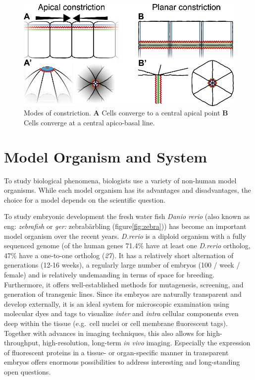 \documentclass[11pt,singlespacinge,twoside]{reedthesis} %
\theoremstyle{definition}
\theoremstyle{definition}
\theoremstyle{definition}
\theoremstyle{remark}
\begin{document}
\begin{figure}

{\centering \includegraphics[width=0.6\linewidth]{figures/intro/constriction} 

}

\caption[Modes of constriction]{Modes of constriction. \textbf{A} Cells converge to a central apical point \textbf{B} Cells converge at a central apico-basal line.}\label{fig:constr}
\end{figure}
\hypertarget{model-organism-and-system}{%
\section{Model Organism and System}\label{model-organism-and-system}}

To study biological phenomena, biologists use a variety of non-human model organisms. While each model organism has its advantages and disadvantages, the choice for a model depends on the scientific question.

To study embryonic development the fresh water fish \emph{Danio rerio} (also known as eng: \emph{zebrafish} or \emph{ger:} zebrabärbling (figure\ref{fig:zebra})) has become an important model organism over the recent years. \emph{D.rerio} is a diploid organism with a fully sequenced genome (of the human genes 71.4\% have at least one \emph{D.rerio} ortholog, 47\% have a one-to-one ortholog (\emph{27}). It has a relatively short alternation of generations (12-16 weeks), a regularly large number of embryos (100 / week / female) and is relatively undemanding in terms of space for breeding. Furthermore, it offers well-established methods for mutagenesis, screening, and generation of transgenic lines. Since its embryos are naturally transparent and develop externally, it is an ideal system for microscopic examination using molecular dyes and tags to visualize \emph{inter} and \emph{intra} cellular components even deep within the tissue (e.g.~cell nuclei or cell membrane fluorescent tags). Together with advances in imaging techniques, this also allows for high-throughput, high-resolution, long-term \emph{in vivo} imaging. Especially the expression of fluorescent proteins in a tissue- or organ-specific manner in transparent embryos offers enormous possibilities to address interesting and long-standing open questions.
\end{document}
